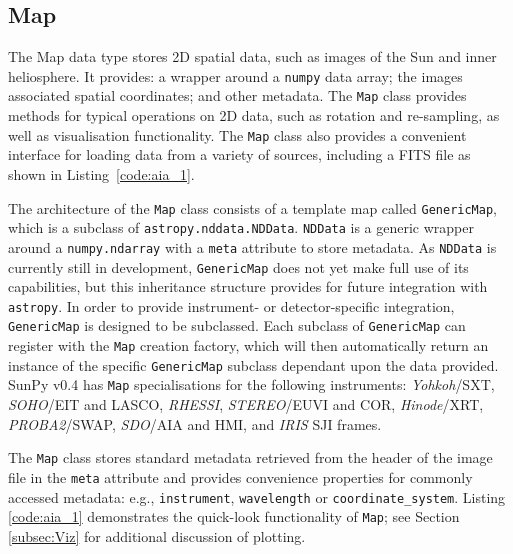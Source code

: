 \subsection{Map}\label{ssec:map}
The Map data type stores 2D spatial data, such as images of the Sun and 
inner heliosphere. It provides: a wrapper around a \texttt{numpy} data array; 
the images associated spatial coordinates; and other metadata. The \texttt{Map} 
class provides methods for typical operations on 2D data, such as rotation and 
re-sampling, as well as visualisation functionality.
The \texttt{Map} class also provides a convenient interface for loading data 
from a variety of sources, including a FITS file as shown in 
Listing~\ref{code:aia_1}.

The architecture of the \texttt{Map} class consists of a template map called
\texttt{GenericMap}, which is a subclass of \texttt{astropy.nddata.NDData}. 
\texttt{NDData} is a generic wrapper around a \texttt{numpy.ndarray} with a 
\texttt{meta} attribute to store metadata.
As \texttt{NDData} is currently still in development, \texttt{GenericMap} does 
not yet make full use of its capabilities, but this inheritance structure 
provides for future integration with \texttt{astropy}. In order to provide 
instrument- or detector-specific integration, \texttt{GenericMap} is designed
to be subclassed. Each subclass of \texttt{GenericMap} can register 
with the \texttt{Map} creation factory, which will then automatically return an instance
of the specific \texttt{GenericMap} subclass dependant upon the data provided. 
SunPy v0.4 has \texttt{Map} specialisations for the following instruments: 
\textit{Yohkoh}/SXT, \textit{SOHO}/EIT and LASCO, \textit{RHESSI}, 
\textit{STEREO}/EUVI and COR, \textit{Hinode}/XRT,
\textit{PROBA2}/SWAP, \textit{SDO}/AIA and HMI, 
and \textit{IRIS} SJI frames. 

The \texttt{Map} class stores standard metadata retrieved from the header of 
the image file in the \texttt{meta} attribute and provides convenience 
properties for commonly accessed metadata: e.g., \texttt{instrument}, 
\texttt{wavelength} or \texttt{coordinate\_system}. 
Listing \ref{code:aia_1} demonstrates the quick-look functionality of 
\texttt{Map}; see Section \ref{subsec:Viz} for additional discussion of plotting.

